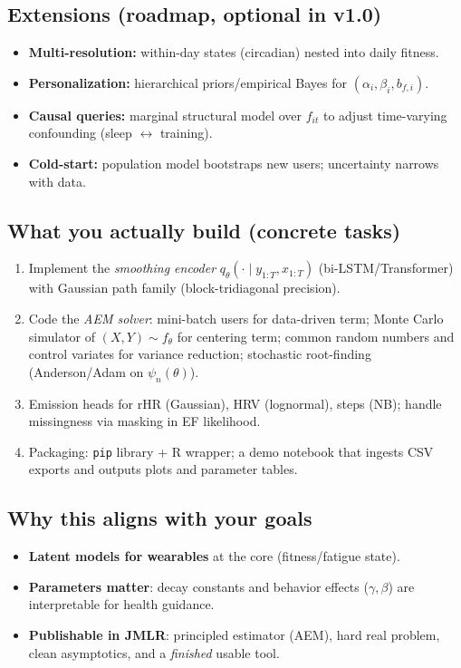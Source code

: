 \subsection*{Extensions (roadmap, optional in v1.0)}
\begin{itemize}
\item \textbf{Multi-resolution:} within-day states (circadian) nested into daily fitness.
\item \textbf{Personalization:} hierarchical priors/empirical Bayes for \((\alpha_i,\beta_i,b_{f,i})\).
\item \textbf{Causal queries:} marginal structural model over \(f_{it}\) to adjust time-varying confounding (sleep \(\leftrightarrow\) training).
\item \textbf{Cold-start:} population model bootstraps new users; uncertainty narrows with data.
\end{itemize}

\subsection*{What you actually build (concrete tasks)}
\begin{enumerate}
\item Implement the \emph{smoothing encoder} \(q_\theta(\cdot\mid y_{1:T},x_{1:T})\) (bi-LSTM/Transformer) with Gaussian path family (block-tridiagonal precision).
\item Code the \emph{AEM solver}: mini-batch users for data-driven term; Monte Carlo simulator of \((X,Y)\sim f_\theta\) for centering term; common random numbers and control variates for variance reduction; stochastic root-finding (Anderson/Adam on \(\psi_n(\theta)\)).
\item Emission heads for rHR (Gaussian), HRV (lognormal), steps (NB); handle missingness via masking in EF likelihood.
\item Packaging: \texttt{pip} library + R wrapper; a demo notebook that ingests CSV exports and outputs plots and parameter tables.
\end{enumerate}

\subsection*{Why this aligns with your goals}
\begin{itemize}
\item \textbf{Latent models for wearables} at the core (fitness/fatigue state).
\item \textbf{Parameters matter}: decay constants and behavior effects (\(\gamma,\beta\)) are interpretable for health guidance.
\item \textbf{Publishable in JMLR}: principled estimator (AEM), hard real problem, clean asymptotics, and a \emph{finished} usable tool.
\end{itemize}

